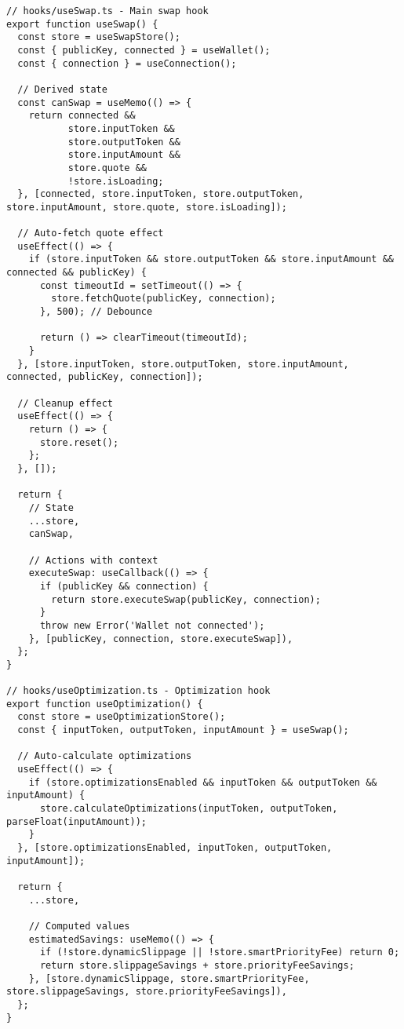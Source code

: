 \documentclass[11pt,a4paper]{article}
\begin{document}
\begin{lstlisting}[style=typescript, caption=Custom Hook Pattern Implementation]
// hooks/useSwap.ts - Main swap hook
export function useSwap() {
  const store = useSwapStore();
  const { publicKey, connected } = useWallet();
  const { connection } = useConnection();
  
  // Derived state
  const canSwap = useMemo(() => {
    return connected && 
           store.inputToken && 
           store.outputToken && 
           store.inputAmount && 
           store.quote &&
           !store.isLoading;
  }, [connected, store.inputToken, store.outputToken, store.inputAmount, store.quote, store.isLoading]);

  // Auto-fetch quote effect
  useEffect(() => {
    if (store.inputToken && store.outputToken && store.inputAmount && connected && publicKey) {
      const timeoutId = setTimeout(() => {
        store.fetchQuote(publicKey, connection);
      }, 500); // Debounce

      return () => clearTimeout(timeoutId);
    }
  }, [store.inputToken, store.outputToken, store.inputAmount, connected, publicKey, connection]);

  // Cleanup effect
  useEffect(() => {
    return () => {
      store.reset();
    };
  }, []);

  return {
    // State
    ...store,
    canSwap,
    
    // Actions with context
    executeSwap: useCallback(() => {
      if (publicKey && connection) {
        return store.executeSwap(publicKey, connection);
      }
      throw new Error('Wallet not connected');
    }, [publicKey, connection, store.executeSwap]),
  };
}

// hooks/useOptimization.ts - Optimization hook
export function useOptimization() {
  const store = useOptimizationStore();
  const { inputToken, outputToken, inputAmount } = useSwap();
  
  // Auto-calculate optimizations
  useEffect(() => {
    if (store.optimizationsEnabled && inputToken && outputToken && inputAmount) {
      store.calculateOptimizations(inputToken, outputToken, parseFloat(inputAmount));
    }
  }, [store.optimizationsEnabled, inputToken, outputToken, inputAmount]);

  return {
    ...store,
    
    // Computed values
    estimatedSavings: useMemo(() => {
      if (!store.dynamicSlippage || !store.smartPriorityFee) return 0;
      return store.slippageSavings + store.priorityFeeSavings;
    }, [store.dynamicSlippage, store.smartPriorityFee, store.slippageSavings, store.priorityFeeSavings]),
  };
}
\end{lstlisting}
\end{document}

